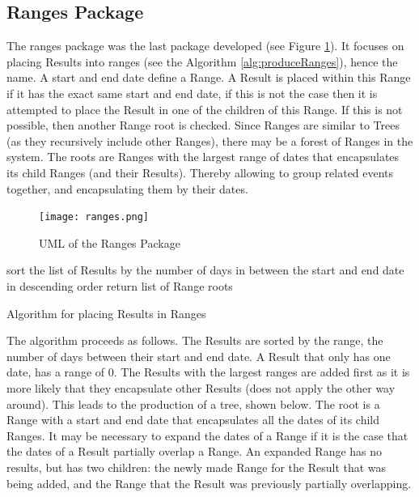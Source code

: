 \subsection{Ranges Package}
\par The ranges package was the last package developed (see Figure \ref{fig:ranges}). It focuses on placing Results into ranges (see the Algorithm \ref{alg:produceRanges}), hence the name. A start and end date define a Range. A Result is placed within this Range if it has the exact same start and end date, if this is not the case then it is attempted to place the Result in one of the children of this Range. If this is not possible, then another Range root is checked. Since Ranges are similar to Trees (as they recursively include other Ranges), there may be a forest of Ranges in the system. The roots are Ranges with the largest range of dates that encapsulates its child Ranges (and their Results). Thereby allowing to group related events together, and encapsulating them by their dates.  
\begin{figure}[H]
\caption{UML of the Ranges Package}
\label{fig:ranges}
\texttt{[image: ranges.png]}
\centering
\end{figure}
\begin{algorithm}
sort the list of Results by the number of days in between the start and end date in descending order\;
return list of Range roots\;
\caption{Algorithm for placing Results in Ranges}
\label{alg:produceRanges}
\end{algorithm}
\par The algorithm proceeds as follows. The Results are sorted by the range, the number of days between their start and end date. A Result that only has one date, has a range of 0. The Results with the largest ranges are added first as it is more likely that they encapsulate other Results (does not apply the other way around). This leads to the production of a tree, shown below. The root is a Range with a start and end date that encapsulates all the dates of its child Ranges. It may be necessary to expand the dates of a Range if it is the case that the dates of a Result partially overlap a Range. An expanded Range has no results, but has two children: the newly made Range for the Result that was being added, and the Range that the Result was previously partially overlapping.

